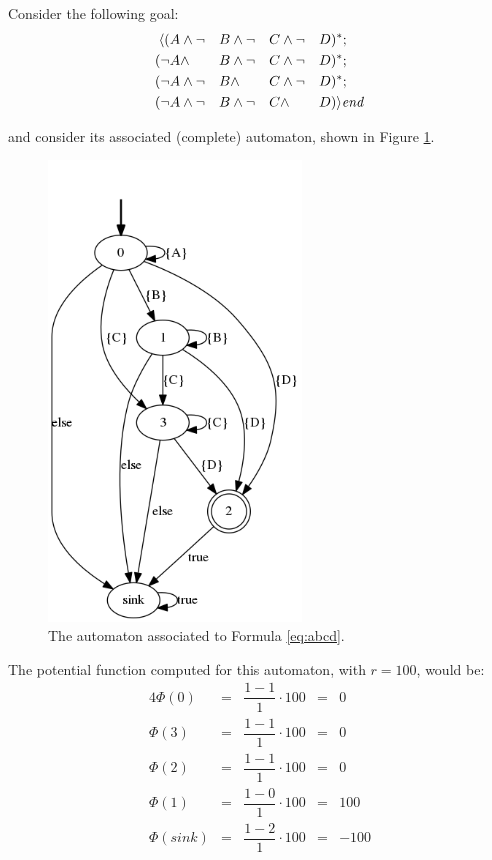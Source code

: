 \begin{example}\label{exa:rs-abcd}
	Consider the following \LDLf goal:
	\begin{alignat}{4}\label{eq:abcd}
	\langle (      &A  \wedge  \lnot &&B  \wedge  \lnot &&C  \wedge  \lnot &&D)^*;\nonumber\\
	     (\lnot  &A  \wedge        &&B  \wedge  \lnot &&C  \wedge  \lnot &&D)^*;\nonumber\\
	     (\lnot  &A  \wedge  \lnot &&B  \wedge        &&C  \wedge  \lnot &&D)^*;\nonumber\\
	     (\lnot  &A  \wedge  \lnot &&B  \wedge  \lnot &&C  \wedge        &&D) \rangle\mathit{end}
	\end{alignat}
	
	and consider its associated (complete) automaton, shown in Figure \ref{fig:abcd}.
	\begin{figure}[h!]
		\centering
		\includegraphics[width=0.6\textwidth]{images/abcd-sink}
		\caption{The automaton associated to Formula \ref{eq:abcd}.}
		\label{fig:abcd}
	\end{figure}
	
	The potential function computed for this automaton, with $r=100$, would be:
	\begin{alignat*}{4}
	\Phi(0)    & = & \dfrac{1 - 1}{1}\cdot 100 & = & 0\\
	\Phi(3)    & = & \dfrac{1 - 1}{1}\cdot 100 & = & 0\\
	\Phi(2)    & = & \dfrac{1 - 1}{1}\cdot 100 & = & 0\\
	\Phi(1)    & = & \dfrac{1 - 0}{1}\cdot 100 & = & 100\\
	\Phi(sink) & = & \dfrac{1 - 2}{1}\cdot 100 & = & -100
	\end{alignat*}
	

\end{example}
